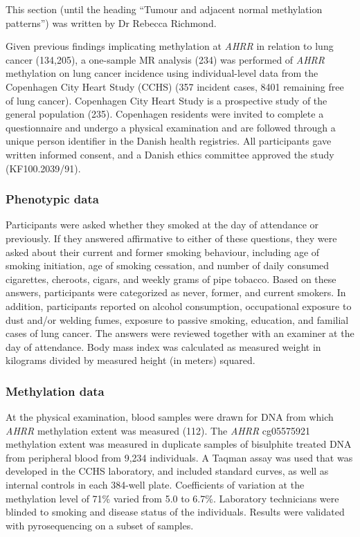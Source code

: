 \documentclass[11pt,oneside]{bristolthesis}
\begin{document}
This section (until the heading ``Tumour and adjacent normal methylation patterns'') was written by Dr Rebecca Richmond.

Given previous findings implicating methylation at \emph{AHRR} in relation to lung cancer (134,205), a one-sample MR analysis (234) was performed of \emph{AHRR} methylation on lung cancer incidence using individual-level data from the Copenhagen City Heart Study (CCHS) (357 incident cases, 8401 remaining free of lung cancer). Copenhagen City Heart Study is a prospective study of the general population (235). Copenhagen residents were invited to complete a questionnaire and undergo a physical examination and are followed through a unique person identifier in the Danish health registries. All participants gave written informed consent, and a Danish ethics committee approved the study (KF100.2039/91).

\hypertarget{phenotypic-data}{%
\subsubsection{Phenotypic data}\label{phenotypic-data}}

Participants were asked whether they smoked at the day of attendance or previously. If they answered affirmative to either of these questions, they were asked about their current and former smoking behaviour, including age of smoking initiation, age of smoking cessation, and number of daily consumed cigarettes, cheroots, cigars, and weekly grams of pipe tobacco. Based on these answers, participants were categorized as never, former, and current smokers. In addition, participants reported on alcohol consumption, occupational exposure to dust and/or welding fumes, exposure to passive smoking, education, and familial cases of lung cancer. The answers were reviewed together with an examiner at the day of attendance. Body mass index was calculated as measured weight in kilograms divided by measured height (in meters) squared.

\hypertarget{methylation-data}{%
\subsubsection{Methylation data}\label{methylation-data}}

At the physical examination, blood samples were drawn for DNA from which \emph{AHRR} methylation extent was measured (112). The \emph{AHRR} cg05575921 methylation extent was measured in duplicate samples of bisulphite treated DNA from peripheral blood from 9,234 individuals. A Taqman assay was used that was developed in the CCHS laboratory, and included standard curves, as well as internal controls in each 384-well plate. Coefficients of variation at the methylation level of 71\% varied from 5.0 to 6.7\%. Laboratory technicians were blinded to smoking and disease status of the individuals. Results were validated with pyrosequencing on a subset of samples.
\end{document}
